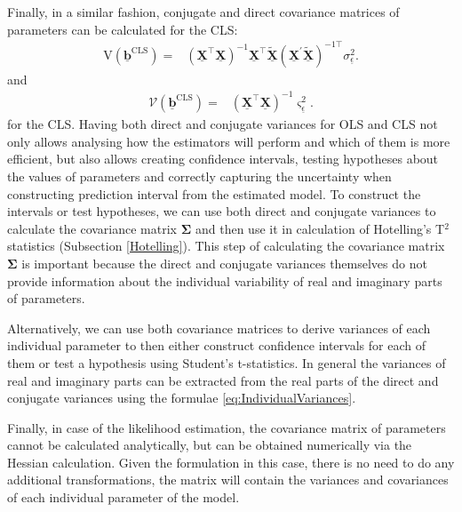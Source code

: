 \documentclass[
]{book}
\begin{document}
Finally, in a similar fashion, conjugate and direct covariance matrices of parameters can be calculated for the CLS:
\begin{equation}
    \begin{aligned}
        \mathrm{V}\left( \underline{\boldsymbol{b}}^{\text{CLS}} \right) =
        & \left( \underline{\mathbf{X}}^\top \underline{\mathbf{X}} \right)^{-1} \underline{\mathbf{X}}^\top \tilde{\underline{\mathbf{X}}} \left( {\underline{\mathbf{X}}}^\prime \tilde{\underline{\mathbf{X}}} \right)^{-1 \top}  \sigma_{\underline{\epsilon}}^2 .
    \end{aligned}
    \label{eq:MCLRCLSConjVar}
\end{equation}
and
\begin{equation}
    \begin{aligned}
        \mathcal{V}\left( \underline{\boldsymbol{b}}^{\text{CLS}} \right) =
        & \left( \underline{\mathbf{X}}^\top \underline{\mathbf{X}} \right)^{-1} \varsigma_{\underline{\epsilon}}^2 .
    \end{aligned}
    \label{eq:MCLROLSDirVar}
\end{equation}
for the CLS. Having both direct and conjugate variances for OLS and CLS not only allows analysing how the estimators will perform and which of them is more efficient, but also allows creating confidence intervals, testing hypotheses about the values of parameters and correctly capturing the uncertainty when constructing prediction interval from the estimated model. To construct the intervals or test hypotheses, we can use both direct and conjugate variances to calculate the covariance matrix \({\boldsymbol{\Sigma}}\) and then use it in calculation of Hotelling's T\(^2\) statistics (Subsection \ref{Hotelling}). This step of calculating the covariance matrix \({\boldsymbol{\Sigma}}\) is important because the direct and conjugate variances themselves do not provide information about the individual variability of real and imaginary parts of parameters.

Alternatively, we can use both covariance matrices to derive variances of each individual parameter to then either construct confidence intervals for each of them or test a hypothesis using Student's t-statistics. In general the variances of real and imaginary parts can be extracted from the real parts of the direct and conjugate variances using the formulae \eqref{eq:IndividualVariances}.

Finally, in case of the likelihood estimation, the covariance matrix of parameters cannot be calculated analytically, but can be obtained numerically via the Hessian calculation. Given the formulation in this case, there is no need to do any additional transformations, the matrix will contain the variances and covariances of each individual parameter of the model.
\end{document}
